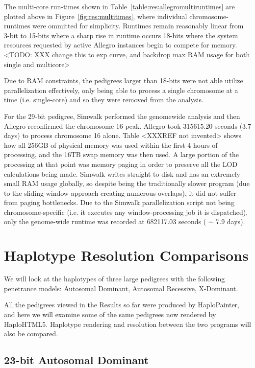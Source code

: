 The multi-core run-times shown in Table~\ref{table:res:allegromultiruntimes} are plotted above in Figure~\ref{fig:res:multitimes}, where individual chromosome-runtimes were ommitted for simplicity.   Runtimes remain reasonably linear from 3-bit to 15-bits where a sharp rise in runtime occurs 18-bits where the system resources requested by active Allegro instances begin to compete for memory.
<TODO: XXX change this to exp curve, and backdrop max RAM usage  for both single and multicore>

Due to RAM constraints, the pedigrees larger than 18-bits were not able utilize parallelization effectively, only being able to process a single chromosome at a time (i.e. single-core) and so they were removed from the analysis.

For the 29-bit pedigree, Simwalk performed the genomewide analysis and then Allegro reconfirmed the chromosome 16 peak. Allegro took 315615.20 seconds (3.7 days) to process chromosome 16 alone. Table <XXXREF not invented> shows how all 256GB of physical memory was used within the first 4 hours of processing, and the 16TB swap memory was then used. A large portion of the processing at that point was memory paging in order to preserve all the LOD calculations being made.  Simwalk writes straight to disk and has an extremely small RAM usage globally, so despite being the traditionally slower program (due to the sliding-window approach creating numerous overlaps), it did not suffer from paging bottlenecks. Due to the Simwalk parallelization script not being chromosome-specific (i.e. it executes any window-processing job it is dispatched), only the genome-wide runtime was recorded at 682117.03 seconds ( $\sim$ 7.9 days).



\section{Haplotype Resolution Comparisons}\label{ref:res:hapcomp}

We will look at the haplotypes of three large pedigrees with the following penetrance models: Autosomal Dominant, Autosomal Recessive, X-Dominant.

All the pedigrees viewed in the Results so far were produced by HaploPainter, and here we will examine some of the same pedigrees now rendered by HaploHTML5. Haplotype rendering and resolution between the two programs will also be compared.

\subsection{23-bit Autosomal Dominant}

